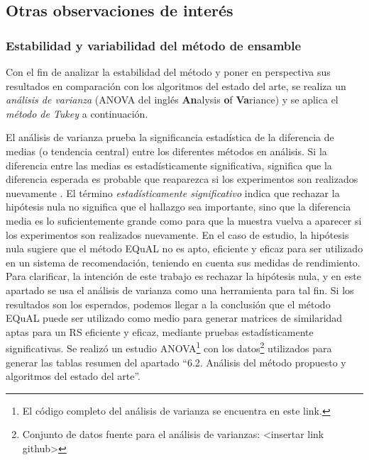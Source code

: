 \subsection{Otras observaciones de interés}

\subsubsection{Estabilidad y variabilidad del método de ensamble}

Con el fin de analizar la estabilidad del método y poner en perspectiva sus resultados en comparación con los algoritmos del estado del arte, se realiza un \textit{análisis de varianza} (ANOVA del inglés \textbf{An}alysis \textbf{o}f \textbf{Va}riance) y se aplica el \textit{método de Tukey} a continuación.

\bigskip El análisis de varianza prueba la significancia estadística de la diferencia de medias (o tendencia central) entre los diferentes métodos en análisis. Si la diferencia entre las medias es estadísticamente significativa, significa que la diferencia esperada es probable que reaparezca si los experimentos son realizados nuevamente \citep{tabachnick2007experimental}. El término \textit{estadísticamente significativo} indica que rechazar la hipótesis nula no significa que el hallazgo sea importante, sino que la diferencia media es lo suficientemente grande como para que la muestra vuelva a aparecer si los experimentos son realizados nuevamente. En el caso de estudio, la hipótesis nula sugiere que el método EQuAL no es apto, eficiente y eficaz para ser utilizado en un sistema de recomendación, teniendo en cuenta sus medidas de rendimiento. Para clarificar, la intención de este trabajo es rechazar la hipótesis nula, y en este apartado se usa el análisis de varianza como una herramienta para tal fin. Si los resultados son los esperados, podemos llegar a la conclusión que el método EQuAL puede ser utilizado como medio para generar matrices de similaridad aptas para un RS eficiente y eficaz, mediante pruebas estadísticamente significativas. Se realizó un estudio ANOVA\footnote{El código completo del análisis de varianza se encuentra en este link.} con los datos\footnote{Conjunto de datos fuente para el análisis de varianzas: <insertar link github>} utilizados para generar las tablas resumen del apartado “6.2. Análisis del método propuesto y algoritmos del estado del arte”.

